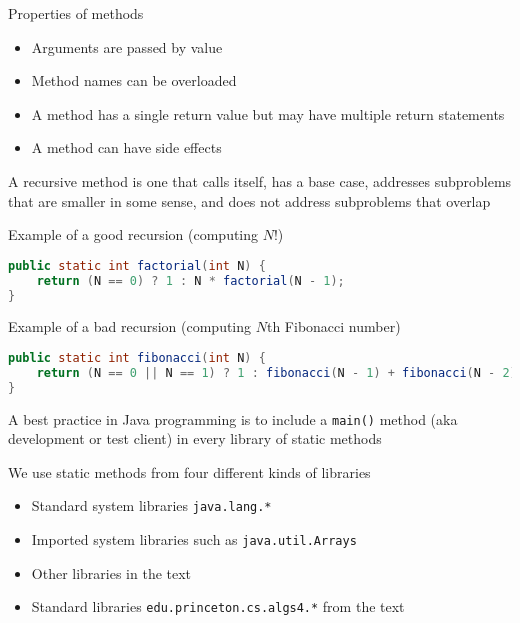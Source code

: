 \documentclass[8pt,a4paper,compress]{beamer}
\begin{document}
\begin{frame}[fragile]
Properties of methods
\begin{itemize}
\item Arguments are passed by value
\item Method names can be overloaded 
\item A method has a single return value but may have multiple return statements
\item A method can have side effects
\end{itemize}

\bigskip

A recursive method is one that calls itself, has a base case, addresses subproblems that are smaller in some sense, and does not address subproblems that overlap

\bigskip

Example of a good recursion (computing $N!$)
\begin{lstlisting}[language=Java]
public static int factorial(int N) {
    return (N == 0) ? 1 : N * factorial(N - 1); 
}
\end{lstlisting}

\bigskip

Example of a bad recursion (computing $N$th Fibonacci number)
\begin{lstlisting}[language=Java]
public static int fibonacci(int N) {
    return (N == 0 || N == 1) ? 1 : fibonacci(N - 1) + fibonacci(N - 2); 
}
\end{lstlisting}
\end{frame}

\begin{frame}[fragile]
A best practice in Java programming is to include a \lstinline{main()} method (aka development or test client) in every library of static methods

\bigskip

We use static methods from four different kinds of libraries
\begin{itemize}
\item Standard system libraries \lstinline{java.lang.*}
\item Imported system libraries such as \lstinline{java.util.Arrays}
\item Other libraries in the text
\item Standard libraries \lstinline{edu.princeton.cs.algs4.*} from the text
\end{itemize}
\end{frame}
\end{document}
